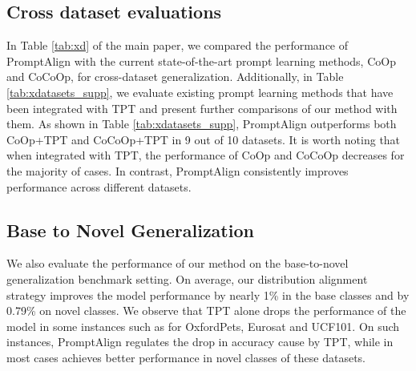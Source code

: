 \subsection{Cross dataset evaluations}
\label{supp:xdatasets}
In Table \ref{tab:xd} of the main paper, we compared the performance of PromptAlign with the current state-of-the-art prompt learning methods, CoOp and CoCoOp, for cross-dataset generalization. Additionally, in Table \ref{tab:xdatasets_supp}, we evaluate existing prompt learning methods that have been integrated with TPT and present further comparisons of our method with them. As shown in Table \ref{tab:xdatasets_supp}, PromptAlign outperforms both CoOp+TPT and CoCoOp+TPT in 9 out of 10 datasets. It is worth noting that when integrated with TPT, the performance of CoOp and CoCoOp decreases for the majority of cases. In contrast, PromptAlign consistently improves performance across different datasets.

\subsection{Base to Novel Generalization}
\label{supp:b2n}
We also evaluate the performance of our method on the base-to-novel generalization benchmark setting. On average, our distribution alignment strategy improves the model performance by nearly 1\% in the base classes and by 0.79\% on novel classes. We observe that TPT alone drops the performance of the model in some instances such as for OxfordPets, Eurosat and UCF101. On such instances, PromptAlign regulates the drop in accuracy cause by TPT, while in most cases achieves better performance in novel classes of these datasets. 
\vspace{-1em}



